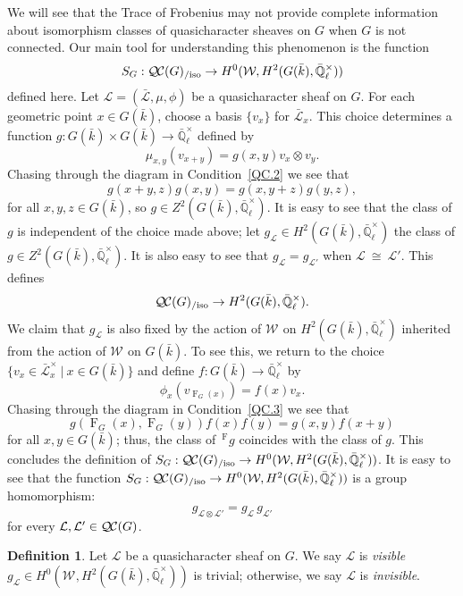 \documentclass{amsart}
\theoremstyle{plain}
\theoremstyle{definition}
\newtheorem{definition}[theorem]{Definition}
\theoremstyle{remark}
\newcommand{\EE}{\mathbb{\bar Q}_\ell}
\newcommand{\bFq}{\bar{k}}
\newcommand{\EEx}{\EE^\times}
\newcommand{\Weil}[1]{\mathcal{W}_{#1}}
\newcommand{\Frob}[1]{\operatorname{F}_{#1}}
\newcommand{\tq}{{\ \vert\ }}
\newcommand{\iso}{{\ \cong\ }}
\newcommand{\qcs}[1]{{\mathcal{#1}}}
\newcommand{\gqcs}[1]{{\mathcal{\bar #1}}}
\newcommand{\QC}{{\mathcal{Q\hskip-0.8pt C}}}
\newcommand{\QCiso}[1]{\QC(#1)_{/\text{iso}}}
\begin{document}
We will see that the Trace of Frobenius may not provide complete
information about isomorphism classes of quasicharacter sheaves on $G$ when $G$ is not connected.
Our main tool for understanding this phenomenon is the function
\begin{equation}\label{2cocycle}
S_{G}: \QCiso{G} \to H^0(\Weil{},H^2(G(\bFq),\EEx))
\end{equation}
defined here.
Let $\qcs{L} = (\gqcs{L},\mu,\phi)$ be a quasicharacter sheaf on $G$.
For each geometric point $x\in G(\bFq)$, choose a basis $\{ v_x \}$ for $\gqcs{L}_x$.
This choice determines a function $g : G(\bFq)\times G(\bFq) \to \EEx$ defined by
\[
\mu_{x,y}(v_{x+y}) = g(x,y) v_x \otimes v_y.
\]
Chasing through the diagram in Condition~\ref{QC.2} we see that
\[
g(x+y,z) g(x,y) = g(x,y+z) g(y,z),
\]
for all $x,y,z\in G(\bFq)$, so $g \in Z^2(G(\bFq),\EEx)$.
It is easy to see that the class of $g$ is independent of the choice made above;
let $g_\mathcal{L} \in H^2(G(\bFq),\EEx)$ the class of $g\in Z^2(G(\bFq),\EEx)$.
It is also easy to see that $g_\mathcal{L} = g_\mathcal{L'}$ when $\qcs{L} \iso \qcs{L'}$. This defines
\[
\QCiso{G} \to H^2(G(\bFq),\EEx).
\]
We claim that $g_\qcs{L}$ is also fixed by the action of $\Weil{}$ on $H^2(G(\bFq),\EEx)$
inherited from the action of $\Weil{}$ on $G(\bFq)$.
To see this, we return to the choice $\{ v_x \in \gqcs{L}_x^\times \tq x\in G(\bFq) \}$
and define $f : G(\bFq) \to \EEx$ by
\[
\phi_x(v_{\Frob{G}(x)}) = f(x) v_x.
\]
Chasing through the diagram in Condition~\ref{QC.3} we see that
\begin{equation}\label{nohom}
g(\Frob{G}(x),\Frob{G}(y)) f(x) f(y)  = g(x,y) f(x+y)
\end{equation}
for all $x,y \in G(\bFq)$; thus, the class of $\,^{\Frob{}}g$ coincides with the class of $g$.
This concludes the definition of
$S_{G}: \QCiso{G} \to H^0(\Weil{},H^2(G(\bFq),\EEx))$.
It is easy to see that the function $S_{G}: \QCiso{G} \to H^0(\Weil{},H^2(G(\bFq),\EEx))$ is a group homomorphism:
\[
g_{\qcs{L}\otimes \qcs{L'}} = g_{\qcs{L}} \, g_\qcs{L'}
\]
for every $\qcs{L}, \qcs{L'} \in \QC(G)$.

\begin{definition}\label{def:invisible}
Let $\qcs{L}$ be a quasicharacter sheaf on $G$. We say $\qcs{L}$ is \emph{visible} $g_\qcs{L} \in H^0(\Weil{},H^2(G(\bFq),\EEx))$ is trivial; otherwise, we say $\qcs{L}$ is \emph{invisible}.
\end{definition}
\end{document}
